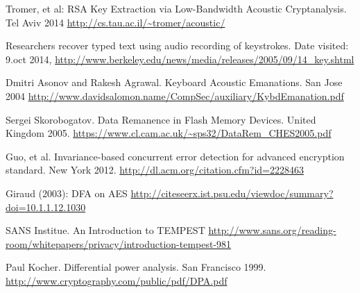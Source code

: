 \renewcommand*{\bibname}{References}



\begin{thebibliography}{11}


 Tromer, et al: RSA Key Extraction via Low-Bandwidth Acoustic Cryptanalysis. Tel Aviv 2014 
\url{http://cs.tau.ac.il/~tromer/acoustic/}



 Researchers recover typed text using audio recording of keystrokes. Date visited: 9.oct 2014, 
\url{http://www.berkeley.edu/news/media/releases/2005/09/14_key.shtml}

 Dmitri Asonov and Rakesh Agrawal. Keyboard Acoustic Emanations. San Jose 2004
\url{http://www.davidsalomon.name/CompSec/auxiliary/KybdEmanation.pdf}


 Sergei Skorobogatov. Data Remanence in Flash Memory Devices. United Kingdom 2005. 
\url{https://www.cl.cam.ac.uk/~sps32/DataRem_CHES2005.pdf}


 Guo, et al. Invariance-based concurrent error detection for advanced encryption standard. New York 2012.
\url{http://dl.acm.org/citation.cfm?id=2228463}

 Giraud (2003): DFA on AES
\url{http://citeseerx.ist.psu.edu/viewdoc/summary?doi=10.1.1.12.1030}


 SANS Institue. An Introduction to TEMPEST
\url{http://www.sans.org/reading-room/whitepapers/privacy/introduction-tempest-981}



 Paul Kocher. Differential power analysis. San Francisco 1999.
\url{http://www.cryptography.com/public/pdf/DPA.pdf}


\end{thebibliography}
